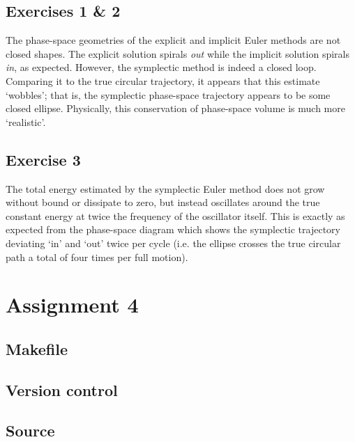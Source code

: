 \documentclass{article}
\theoremstyle{definition}
\begin{document}
\subsection*{Exercises 1 \& 2}
The phase-space geometries of the explicit and implicit Euler methods are not closed shapes. The explicit solution spirals \textit{out} while the implicit solution spirals \textit{in}, as expected. However, the symplectic method is indeed a closed loop. Comparing it to the true circular trajectory, it appears that this estimate `wobbles'; that is, the symplectic phase-space trajectory appears to be some closed ellipse. Physically, this conservation of phase-space volume is much more `realistic'.

\subsection*{Exercise 3}
The total energy estimated by the symplectic Euler method does not grow without bound or dissipate to zero, but instead oscillates around the true constant energy at twice the frequency of the oscillator itself. This is exactly as expected from the phase-space diagram which shows the symplectic trajectory deviating `in' and `out' twice per cycle (i.e. the ellipse crosses the true circular path a total of four times per full motion). 



\section*{Assignment 4}
\subsection*{Makefile}


\subsection*{Version control}



\subsection*{Source}

\end{document}
